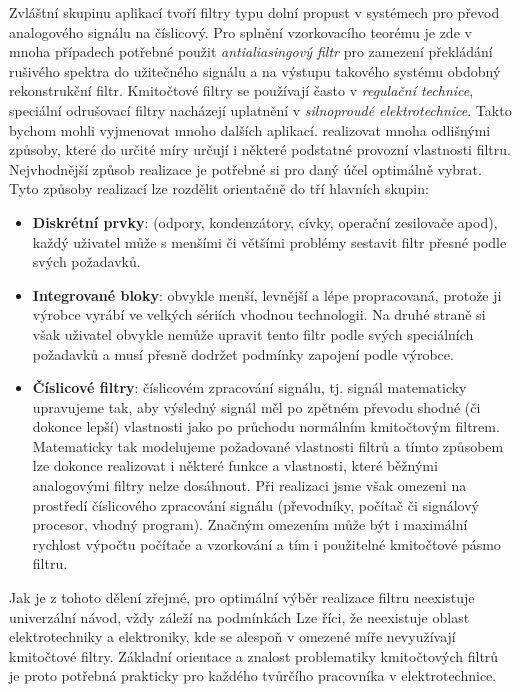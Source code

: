       Zvláštní skupinu aplikací tvoří filtry typu dolní propust v systémech pro převod analogového
      signálu na číslicový. Pro splnění vzorkovacího teorému je zde v mnoha případech potřebné
      použit \emph{antialiasingový filtr} pro zamezení překládání rušivého spektra do užitečného
      signálu a na výstupu takového systému obdobný rekonstrukční filtr. Kmitočtové filtry se
      používají často v \emph{regulační technice}, speciální odrušovací filtry nacházejí uplatnění
      v \emph{silnoproudé elektrotechnice}. Takto bychom mohli vyjmenovat mnoho dalších aplikací.
      realizovat mnoha odlišnými způsoby, které do určité míry určují i některé podstatné provozní
      vlastnosti filtru. Nejvhodnější způsob realizace je potřebné si pro daný účel optimálně
      vybrat. Tyto způsoby realizací lze rozdělit orientačně do tří hlavních skupin:
      \begin{itemize}[noitemsep]
        \item \textbf{Diskrétní prvky}: (odpory, kondenzátory, cívky, operační zesilovače apod),
              každý uživatel může s menšími či většími problémy sestavit filtr přesné podle
              svých požadavků.
        \item \textbf{Integrované bloky}: obvykle menší, levnější a lépe propracovaná, protože ji
              výrobce vyrábí ve velkých sériích vhodnou technologii. Na druhé straně si však
              uživatel obvykle nemůže upravit tento filtr podle svých speciálních požadavků a musí
              přesně dodržet podmínky zapojení podle výrobce.
        \item \textbf{Číslicové filtry}: číslicovém zpracování signálu, tj. signál matematicky
              upravujeme tak, aby výsledný signál měl po zpětném převodu shodné (či dokonce lepší)
              vlastnosti jako po průchodu normálním kmitočtovým filtrem. Matematicky tak
              modelujeme požadované vlastnosti filtrů a tímto způsobem lze dokonce realizovat i
              některé funkce a vlastnosti, které běžnými analogovými filtry nelze dosáhnout. Při
              realizaci jsme však omezeni na prostředí číslicového zpracování signálu (převodníky,
              počítač či signálový procesor, vhodný program). Značným omezením může být i
              maximální rychlost výpočtu počítače a vzorkování a tím i použitelné kmitočtové pásmo
              filtru.         
      \end{itemize}
      Jak je z tohoto dělení zřejmé, pro optimální výběr realizace filtru neexistuje univerzální
      návod, vždy záleží na podmínkách
      Lze říci, že neexistuje oblast elektrotechniky a elektroniky, kde se alespoň v omezené míře
      nevyužívají kmitočtové filtry. Základní orientace a znalost problematiky kmitočtových filtrů
      je proto potřebná prakticky pro každého tvůrčího pracovníka v elektrotechnice.
    
